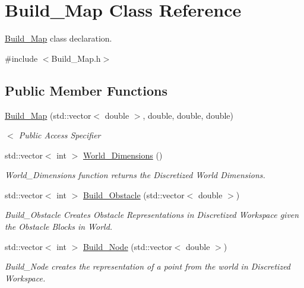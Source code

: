 \hypertarget{classBuild__Map}{}\section{Build\+\_\+\+Map Class Reference}
\label{classBuild__Map}


\hyperlink{classBuild__Map}{Build\+\_\+\+Map} class declaration.  




{\ttfamily \#include $<$Build\+\_\+\+Map.\+h$>$}

\subsection*{Public Member Functions}
\begin{DoxyCompactItemize}
\item 
\hyperlink{classBuild__Map_a1c1ffb3382a1c259bd139076e3ea2bf5}{Build\+\_\+\+Map} (std\+::vector$<$ double $>$, double, double, double)
\begin{DoxyCompactList}\small\item\em $<$ Public Access Specifier \end{DoxyCompactList}\item 
std\+::vector$<$ int $>$ \hyperlink{classBuild__Map_a4471712db8fbd8c8bc2fdefe8c0f551d}{World\+\_\+\+Dimensions} ()
\begin{DoxyCompactList}\small\item\em World\+\_\+\+Dimensions function returns the Discretized World Dimensions. \end{DoxyCompactList}\item 
std\+::vector$<$ int $>$ \hyperlink{classBuild__Map_ac702c59f16705f17230b565d998eecd3}{Build\+\_\+\+Obstacle} (std\+::vector$<$ double $>$)
\begin{DoxyCompactList}\small\item\em Build\+\_\+\+Obstacle Creates Obstacle Representations in Discretized Workspace given the Obstacle Blocks in World. \end{DoxyCompactList}\item 
std\+::vector$<$ int $>$ \hyperlink{classBuild__Map_a69943048bf44783d8413fa2a932225f7}{Build\+\_\+\+Node} (std\+::vector$<$ double $>$)
\begin{DoxyCompactList}\small\item\em Build\+\_\+\+Node creates the representation of a point from the world in Discretized Workspace. \end{DoxyCompactList}\item 

\end{DoxyCompactItemize}
